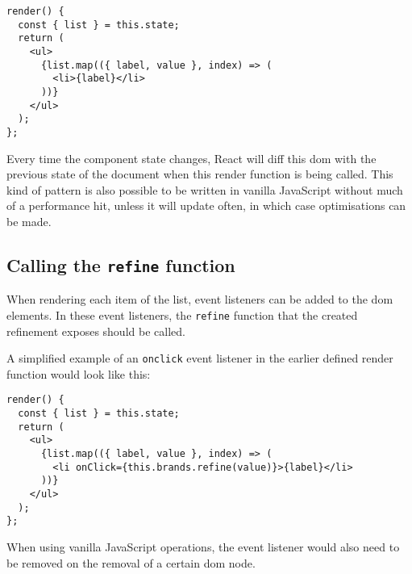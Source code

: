 \begin{minipage}{\linewidth}
\begin{lstlisting}[caption={Taking the data from the refinement and applying it to DOM},label={lst:core-react-dom}]
render() {
  const { list } = this.state;
  return (
    <ul>
      {list.map(({ label, value }, index) => (
        <li>{label}</li>
      ))}
    </ul>
  );
};
\end{lstlisting}
\end{minipage}

Every time the component state changes, React will diff this \acrshort{dom} with the previous state of the document when this render function is being called. This kind of pattern is also possible to be written in vanilla JavaScript without much of a performance hit, unless it will update often, in which case optimisations can be made.

\subsection{Calling the {\tt refine} function}
\label{subs:refining}

When rendering each item of the list, event listeners can be added to the \acrshort{dom} elements. In these event listeners, the {\tt refine} function that the created refinement exposes should be called.

A simplified example of an {\tt onclick} event listener in the earlier defined render function would look like this:

\begin{minipage}{\linewidth}
\begin{lstlisting}[caption={Refining on a user action},label={lst:core-react-refine}]
render() {
  const { list } = this.state;
  return (
    <ul>
      {list.map(({ label, value }, index) => (
        <li onClick={this.brands.refine(value)}>{label}</li>
      ))}
    </ul>
  );
};
\end{lstlisting}
\end{minipage}

When using vanilla JavaScript operations, the event listener would also need to be removed on the removal of a certain \acrshort{dom} node.

